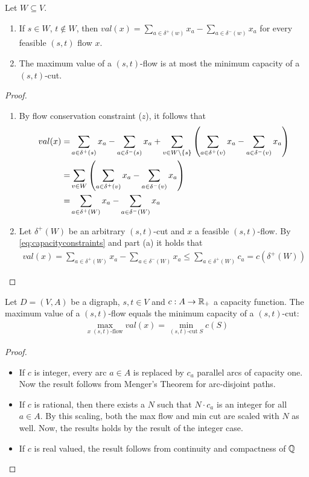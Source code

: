 \begin{lem}
	Let $W \subseteq V$.
	
	\begin{enumerate}
		\item If $s \in W$, $t \not \in W$, then $ val(x) = \sum\limits_{a \in \delta^+(w)}x_a - \sum\limits_{a \in \delta^-(w)}x_a$ for every feasible $(s,t)$ flow $x$.
		\item The maximum value of a $(s,t)$-flow is at most the minimum capacity of a $(s,t)$-cut.
	\end{enumerate}
\end{lem}
\begin{proof}
	\begin{enumerate}
		\item By flow conservation constraint ($z$), it follows that 
		\begin{align*}val(x) =& \sum\limits_{a \in \delta^+(s)}x_a - \sum\limits_{a \in \delta^-(s)}x_a + \sum\limits_{v \in W\setminus\left\{s\right\}}\left(\sum\limits_{a\in \delta^+(v)}x_a-\sum\limits_{a\in \delta^-(v)}x_a\right)\\
		=& \sum\limits_{v \in W}\left(\sum\limits_{a\in \delta^+(v)}x_a-\sum\limits_{a\in \delta^-(v)}x_a\right) \\
		=& \sum\limits_{a\in \delta^+(W)}x_a-\sum\limits_{a\in \delta^-(W)}x_a
		\end{align*}
		\item Let $\delta^+(W)$ be an arbitrary $(s,t)$-cut and $x$ a feasible $(s,t)$-flow. By \eqref{eq:capacityconstraints} and part (a) it holds that \begin{align*}
			val(x) = \sum\limits_{a\in \delta^+(W)}x_a-\sum\limits_{a\in \delta^-(W)}x_a \leq \sum\limits_{a\in \delta^+(W)}c_a=c(\delta^+(W))
		\end{align*}
	\end{enumerate}
\end{proof}
\begin{thm}
Let $D=(V,A)$ be a digraph, $s,t \in V$ and $c: A \rightarrow \mathbb{R}_+$ a capacity function. The maximum value of a $(s,t)$-flow equals the minimum capacity of a $(s,t)$-cut:
\begin{align*}
	\max_{x \; (s,t)\text{-flow}}val(x) = \min_{(s,t)\text{-cut} \; S}c(S)
\end{align*}
\end{thm}

\begin{proof}
\begin{itemize}
	\item If $c$ is integer, every arc $a \in A$ is replaced by $c_a$ parallel arcs of capacity one. Now the result follows from Menger's Theorem for arc-disjoint paths.
	\item If $c$ is rational, then there exists a $N$ such that $N \cdot c_a$ is an integer for all $a \in A$. By this scaling, both the max flow and min cut are scaled with $N$ as well. Now, the results holds by the result of the integer case.
	\item If $c$ is real valued, the result follows from continuity and compactness of $\mathbb{Q}$
\end{itemize}
\end{proof}

